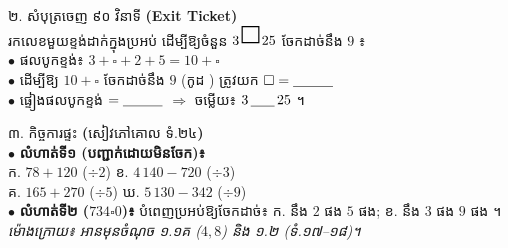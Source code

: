 \documentclass[11pt,a4paper]{article}
\newcommand{\enbf}[1]{{\LatinFont\textbf{#1}}}
\newcommand{\cnum}[1]{{\fontsize{10pt}{11pt}\selectfont\ding{\numexpr181+#1\relax}}\hspace{0.15em}}
\newcommand{\blank}[1]{\underline{\hspace{#1}}}
\newcommand{\numbox}{\tikz[baseline=-0.35ex]\draw[black,line width=0.85pt] (0,0) rectangle (0.42,0.42);}
\begin{document}
\vspace{7pt}
\begin{minipage}[t]{9.25cm}
  \vspace{0pt}
  \begin{tcolorbox}[
    enhanced, sharp corners, colback=panelgray, colframe=black,
    boxrule=0.95pt, boxsep=2pt, top=5pt, bottom=6pt, left=5.5pt, right=5.5pt,
    equal height group=botboxes
  ]
    {\muol\fontsize{8.7pt}{12.2pt}\selectfont ២. សំបុត្រចេញ ៩០ វិនាទី \enbf{(Exit Ticket)}}\\[4pt]
    {\fontsize{8.6pt}{13.6pt}\selectfont
    រកលេខមួយខ្ទង់ដាក់ក្នុងប្រអប់ ដើម្បីឱ្យចំនួន $3\,\numbox\,25$ ចែកដាច់នឹង $9$ ៖\\[4pt]
    $\bullet$ ផលបូកខ្ទង់៖ $3 + \square + 2 + 5 = 10 + \square$\\
    $\bullet$ ដើម្បីឱ្យ $10 + \square$ ចែកដាច់នឹង $9$ (កូដ \cnum{4}) ត្រូវយក $\square = \blank{1.0cm}$\\
    $\bullet$ ផ្ទៀងផលបូកខ្ទង់ $= \blank{1.0cm}$ $\Rightarrow$ ចម្លើយ៖ $3\,\blank{0.6cm}\,25$ ។}
  \end{tcolorbox}
\end{minipage}\hfill%
\begin{minipage}[t]{9.25cm}
  \vspace{0pt}
  \begin{tcolorbox}[
    enhanced, sharp corners, colback=white, colframe=black,
    boxrule=0.95pt, boxsep=2pt, top=5pt, bottom=6pt, left=5.5pt, right=5.5pt,
    equal height group=botboxes
  ]
    {\muol\fontsize{8.7pt}{12.2pt}\selectfont ៣. កិច្ចការផ្ទះ \enbf{(}សៀវភៅគោល ទំ.២៤\enbf{)}}\\[4pt]
    {\fontsize{8.5pt}{13.3pt}\selectfont
    $\bullet$ \textbf{លំហាត់ទី១ (បញ្ជាក់ដោយមិនចែក)៖}\\
    \quad ក. $78+120$ ($\div 2$) \qquad ខ. $4\,140-720$ ($\div 3$)\\
    \quad គ. $165+270$ ($\div 5$) \qquad ឃ. $5\,130-342$ ($\div 9$)\\
    $\bullet$ \textbf{លំហាត់ទី២ ($734\square 0$)៖} បំពេញប្រអប់ឱ្យចែកដាច់៖ ក. នឹង $2$ ផង $5$ ផង; ខ. នឹង $3$ ផង $9$ ផង ។\\[3pt]
    \textit{ម៉ោងក្រោយ៖ អានមុនចំណុច ១.១គ ($4, 8$) និង ១.២ (ទំ.១៧--១៨)។}}
  \end{tcolorbox}
\end{minipage}
\end{document}
